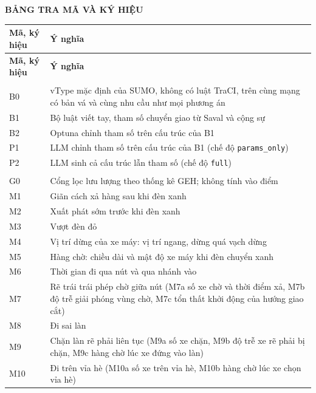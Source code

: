 \documentclass[../main.tex]{subfiles}
\begin{document}
\begin{center}
    \textbf{BẢNG TRA MÃ VÀ KÝ HIỆU}
\end{center}

\begingroup\small
\begin{longtable}{|>{\raggedright\arraybackslash}p{3.0cm}|>{\raggedright\arraybackslash}p{11.0cm}|}
\hline
\textbf{Mã, ký hiệu} & \textbf{Ý nghĩa} \\ \hline
\endfirsthead
\hline
\textbf{Mã, ký hiệu} & \textbf{Ý nghĩa} \\ \hline
\endhead
\multicolumn{2}{|l|}{\textit{Phương án đối sánh (Mục~\ref{section:3.8}, Bảng~\ref{table:3.4})}} \\ \hline
B0 & vType mặc định của SUMO, không có luật TraCI, trên cùng mạng có bản vá và cùng nhu cầu như mọi phương án \\ \hline
B1 & Bộ luật viết tay, tham số chuyển giao từ Saval và cộng sự \\ \hline
B2 & Optuna chỉnh tham số trên cấu trúc của B1 \\ \hline
P1 & LLM chỉnh tham số trên cấu trúc của B1 (chế độ \texttt{params\_only}) \\ \hline
P2 & LLM sinh cả cấu trúc lẫn tham số (chế độ \texttt{full}) \\ \hline
\multicolumn{2}{|l|}{\textit{Chỉ số (Bảng~\ref{table:3.3})}} \\ \hline
G0 & Cổng lọc lưu lượng theo thống kê GEH; không tính vào điểm \\ \hline
M1 & Giãn cách xả hàng sau khi đèn xanh \\ \hline
M2 & Xuất phát sớm trước khi đèn xanh \\ \hline
M3 & Vượt đèn đỏ \\ \hline
M4 & Vị trí dừng của xe máy: vị trí ngang, dừng quá vạch dừng \\ \hline
M5 & Hàng chờ: chiều dài và mật độ xe máy khi đèn chuyển xanh \\ \hline
M6 & Thời gian đi qua nút và qua nhánh vào \\ \hline
M7 & Rẽ trái trái phép chờ giữa nút (M7a số xe chờ và thời điểm xả, M7b độ trễ giải phóng vùng chờ, M7c tổn thất khởi động của hướng giao cắt) \\ \hline
M8 & Đi sai làn \\ \hline
M9 & Chặn làn rẽ phải liên tục (M9a số xe chặn, M9b độ trễ xe rẽ phải bị chặn, M9c hàng chờ lúc xe đứng vào làn) \\ \hline
M10 & Đi trên vỉa hè (M10a số xe trên vỉa hè, M10b hàng chờ lúc xe chọn vỉa hè) \\ \hline

\end{longtable}
\end{document}
